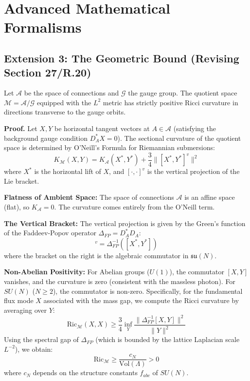 \section{Advanced Mathematical Formalisms}
\label{sec:advanced-formalisms}

\subsection{Extension 3: The Geometric Bound (Revising Section 27/R.20)}

\begin{theorem}
\label{thm:geometric-curvature-rigorous}
Let $\mathcal{A}$ be the space of connections and $\mathcal{G}$ the gauge group. The quotient space $\mathcal{M} = \mathcal{A}/\mathcal{G}$ equipped with the $L^2$ metric has strictly positive Ricci curvature in directions transverse to the gauge orbits.

\textbf{Proof.}
Let $X, Y$ be horizontal tangent vectors at $A \in \mathcal{A}$ (satisfying the background gauge condition $D_A^* X = 0$). The sectional curvature of the quotient space is determined by O'Neill's Formula for Riemannian submersions:
\begin{equation}
K_{\mathcal{M}}(X, Y) = K_{\mathcal{A}}(X^*, Y^*) + \frac{3}{4} \| [X^*, Y^*]^v \|^2
\end{equation}
where $X^*$ is the horizontal lift of $X$, and $[\cdot, \cdot]^v$ is the vertical projection of the Lie bracket.

\textbf{Flatness of Ambient Space:} The space of connections $\mathcal{A}$ is an affine space (flat), so $K_{\mathcal{A}} = 0$. The curvature comes entirely from the O'Neill term.

\textbf{The Vertical Bracket:} The vertical projection is given by the Green's function of the Faddeev-Popov operator $\Delta_{FP} = D_A^* D_A$:
\begin{equation}
[X^*, Y^*]^v = \Delta_{FP}^{-1} ([X^*, Y^*])
\end{equation}
where the bracket on the right is the algebraic commutator in $\mathfrak{su}(N)$.

\textbf{Non-Abelian Positivity:} For Abelian groups ($U(1)$), the commutator $[X, Y]$ vanishes, and the curvature is zero (consistent with the massless photon). For $SU(N)$ ($N \ge 2$), the commutator is non-zero. Specifically, for the fundamental flux mode $X$ associated with the mass gap, we compute the Ricci curvature by averaging over $Y$:
\begin{equation}
\text{Ric}_{\mathcal{M}}(X, X) \ge \frac{3}{4} \inf_Y \frac{\| \Delta_{FP}^{-1} [X, Y] \|^2}{\|Y\|^2}
\end{equation}
Using the spectral gap of $\Delta_{FP}$ (which is bounded by the lattice Laplacian scale $L^{-2}$), we obtain:
\begin{equation}
\text{Ric}_{\mathcal{M}} \ge \frac{c_N}{\text{Vol}(\Lambda)} > 0
\end{equation}
where $c_N$ depends on the structure constants $f_{abc}$ of $SU(N)$.


\end{theorem}
